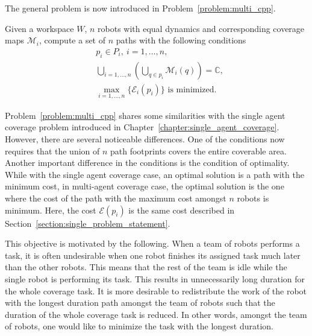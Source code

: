 \documentclass[../main.tex]{subfiles}
\begin{document}
The general problem is now introduced in Problem~\ref{problem:multi_cpp}.
\begin{problem}
\label{problem:multi_cpp}
	Given a workspace $W$, $n$ robots with equal dynamics and corresponding coverage maps $\mathcal{M}_i$, compute a set of $n$ paths with the following conditions
	\begin{equation}
	\begin{aligned}
		& p_i\in P_{i},\ i=1,\dots,n,\\
		& \bigcup_{i=1,\dots,n}(\bigcup_{q\in p_i}\mathcal{M}_i(q))=\mathbb{C},\\
		& \max_{i=1,\ldots,n}\{\mathcal{E}_i(p_i)\}\text{ is minimized.}
	\end{aligned}
	\end{equation}
\end{problem}

Problem~\ref{problem:multi_cpp} shares some similarities with the single agent coverage problem introduced in Chapter~\ref{chapter:single_agent_coverage}. However, there are several noticeable differences. One of the conditions now requires that the union of $n$ path footprints covers the entire coverable area. Another important difference in the conditions is the condition of optimality. While with the single agent coverage case, an optimal solution is a path with the minimum cost, in multi-agent coverage case, the optimal solution is the one where the cost of the path with the maximum cost amongst $n$ robots is minimum. Here, the cost $\mathcal{E}(p_i)$ is the same cost described in Section~\ref{section:single_problem_statement}.

This objective is motivated by the following. When a team of robots performs a task, it is often undesirable when one robot finishes its assigned task much later than the other robots. This means that the rest of the team is idle while the single robot is performing its task. This results in unnecessarily long duration for the whole coverage task. It is more desirable to redistribute the work of the robot with the longest duration path amongst the team of robots such that the duration of the whole coverage task is reduced. In other words, amongst the team of robots, one would like to minimize the task with the longest duration.
\end{document}
